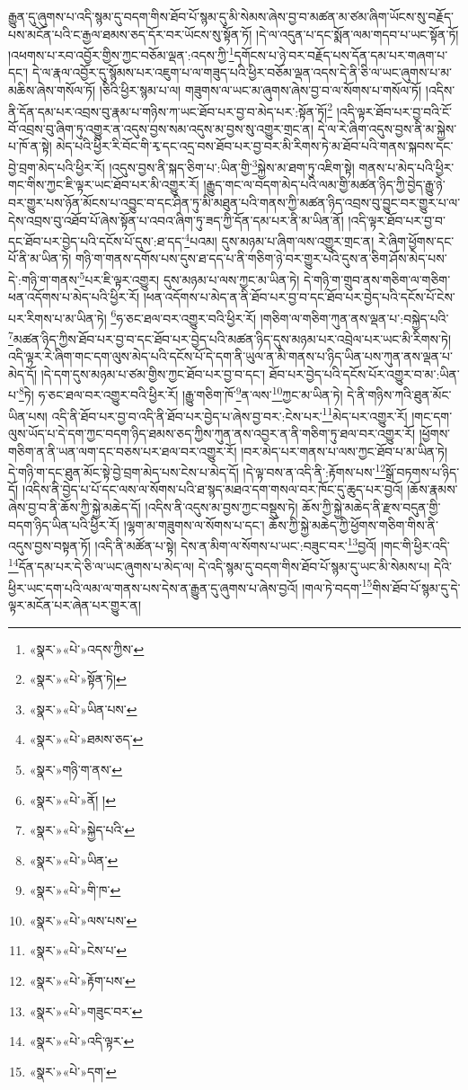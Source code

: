 རྒྱུན་དུ་ཞུགས་པ་འདི་སྙམ་དུ་བདག་གིས་ཐོབ་པོ་སྙམ་དུ་མི་སེམས་ཞེས་བྱ་བ་མཚན་མ་ཙམ་ཞིག་ཡོངས་སུ་བརྗོད་པས་མངོན་པའི་ང་རྒྱལ་ཐམས་ཅད་དོར་བར་ཡོངས་སུ་སྟོན་ཏོ། །དེ་ལ་འདུན་པ་དང་སྨོན་ལམ་གདབ་པ་ཡང་སྟོན་ཏོ། །འཕགས་པ་རབ་འབྱོར་གྱིས་ཀྱང་བཅོམ་ལྡན་:འདས་ཀྱི་\footnote{«སྣར་»«པེ་»འདས་ཀྱིས་}དགོངས་པ་ཉེ་བར་བརྗོད་པས་དོན་དམ་པར་གཞག་པ་དང་། དེ་ལ་རྣལ་འབྱོར་དུ་སྙོམས་པར་འཇུག་པ་ལ་གཟུད་པའི་ཕྱིར་བཅོམ་ལྡན་འདས་དེ་ནི་ཅི་ལ་ཡང་ཞུགས་པ་མ་མཆིས་ཞེས་གསོལ་ཏོ། །ཅིའི་ཕྱིར་སྙམ་པ་ལ། གཟུགས་ལ་ཡང་མ་ཞུགས་ཞེས་བྱ་བ་ལ་སོགས་པ་གསོལ་ཏོ། །འདིས་ནི་དོན་དམ་པར་འབྲས་བུ་རྣམ་པ་གཉིས་ཀ་ཡང་ཐོབ་པར་བྱ་བ་མེད་པར་:སྟོན་ཏོ།\footnote{«སྣར་»«པེ་»སྟོན་ཏེ།} །འདི་ལྟར་ཐོབ་པར་བྱ་བའི་ངོ་བོ་འབྲས་བུ་ཞིག་ཏུ་འགྱུར་ན་འདུས་བྱས་སམ་འདུས་མ་བྱས་སུ་འགྱུར་གྲང་ན། དེ་ལ་རེ་ཞིག་འདུས་བྱས་ནི་མ་སྐྱེས་པ་ཁོ་ན་སྟེ། མེད་པའི་ཕྱིར་རི་བོང་གི་རྭ་དང་འདྲ་བས་ཐོབ་པར་བྱ་བར་མི་རིགས་ཏེ་མ་ཐོབ་པའི་གནས་སྐབས་དང་བྱེ་བྲག་མེད་པའི་ཕྱིར་རོ། །འདུས་བྱས་ནི་སྐད་ཅིག་པ་:ཡིན་གྱི་\footnote{«སྣར་»«པེ་»ཡིན་པས་}སྐྱེས་མ་ཐག་ཏུ་འཇིག་སྟེ། གནས་པ་མེད་པའི་ཕྱིར་གང་གིས་ཀྱང་ཇི་ལྟར་ཡང་ཐོབ་པར་མི་འགྱུར་རོ། །རྒྱུད་གང་ལ་བདག་མེད་པའི་ལམ་གྱི་མཚན་ཉིད་ཀྱི་བྱེད་རྒྱུ་ཉེ་བར་གྱུར་པས་ཉོན་མོངས་པ་འབྱུང་བ་དང་ཤིན་ཏུ་མི་མཐུན་པའི་གནས་ཀྱི་མཚན་ཉིད་འབྲས་བུ་བྱུང་བར་གྱུར་པ་ལ་དེས་འབྲས་བུ་འཐོབ་པོ་ཞེས་སྟོན་པ་འབའ་ཞིག་ཏུ་ཟད་ཀྱི་དོན་དམ་པར་ནི་མ་ཡིན་ནོ། །འདི་ལྟར་ཐོབ་པར་བྱ་བ་དང་ཐོབ་པར་བྱེད་པའི་དངོས་པོ་དུས་:ཐ་དད་\footnote{«སྣར་»«པེ་»ཐམས་ཅད་}པའམ། དུས་མཉམ་པ་ཞིག་ལས་འགྱུར་གྲང་ན། རེ་ཞིག་ཕྱོགས་དང་པོ་ནི་མ་ཡིན་ཏེ། གཉི་ག་གནས་དགོས་པས་དུས་ཐ་དད་པ་ནི་གཅིག་ཉེ་བར་གྱུར་པའི་དུས་ན་ཅིག་ཤོས་མེད་པས་དེ་:གཉི་ག་གནས་\footnote{«སྣར་»གཉི་ག་ནས་}པར་ཇི་ལྟར་འགྱུར། དུས་མཉམ་པ་ལས་ཀྱང་མ་ཡིན་ཏེ། དེ་གཉི་ག་གྲུབ་ནས་གཅིག་ལ་གཅིག་ཕན་འདོགས་པ་མེད་པའི་ཕྱིར་རོ། །ཕན་འདོགས་པ་མེད་ན་ནི་ཐོབ་པར་བྱ་བ་དང་ཐོབ་པར་བྱེད་པའི་དངོས་པོ་ངེས་པར་རིགས་པ་མ་ཡིན་ཏེ། \footnote{«སྣར་»«པེ་»ནོ། ། }ཧ་ཅང་ཐལ་བར་འགྱུར་བའི་ཕྱིར་རོ། །གཅིག་ལ་གཅིག་ཀུན་ནས་ལྡན་པ་:བསྐྱེད་པའི་\footnote{«སྣར་»«པེ་»སྐྱེད་པའི་}མཚན་ཉིད་ཀྱིས་ཐོབ་པར་བྱ་བ་དང་ཐོབ་པར་བྱེད་པའི་མཚན་ཉིད་དུས་མཉམ་པར་འབྲེལ་པར་ཡང་མི་རིགས་ཏེ། འདི་ལྟར་རེ་ཞིག་གང་དག་ལུས་མེད་པའི་དངོས་པོ་དེ་དག་ནི་ཡུལ་ན་མི་གནས་པ་ཉིད་ཡིན་པས་ཀུན་ནས་ལྡན་པ་མེད་དོ། །དེ་དག་དུས་མཉམ་པ་ཙམ་གྱིས་ཀྱང་ཐོབ་པར་བྱ་བ་དང་། ཐོབ་པར་བྱེད་པའི་དངོས་པོར་འགྱུར་བ་མ་:ཡིན་པ་\footnote{«སྣར་»«པེ་»ཡིན་}ཏེ། ཧ་ཅང་ཐལ་བར་འགྱུར་བའི་ཕྱིར་རོ། །རྒྱུ་གཅིག་ཁོ་\footnote{«སྣར་»«པེ་»གི་ཁ་}ན་ལས་\footnote{«སྣར་»«པེ་»ལས་པས་}ཀྱང་མ་ཡིན་ཏེ། དེ་ནི་གཉིས་ཀའི་ཐུན་མོང་ཡིན་པས། འདི་ནི་ཐོབ་པར་བྱ་བ་འདི་ནི་ཐོབ་པར་བྱེད་པ་ཞེས་བྱ་བར་:ངེས་པར་\footnote{«སྣར་»«པེ་»ངེས་པ་}མེད་པར་འགྱུར་རོ། །གང་དག་ལུས་ཡོད་པ་དེ་དག་ཀྱང་བདག་ཉིད་ཐམས་ཅད་ཀྱིས་ཀུན་ནས་འབྱར་ན་ནི་གཅིག་ཏུ་ཐལ་བར་འགྱུར་རོ། །ཕྱོགས་གཅིག་ན་ནི་ཡན་ལག་དང་བཅས་པར་ཐལ་བར་འགྱུར་རོ། །བར་མེད་པར་གནས་པ་ལས་ཀྱང་ཐོབ་པ་མ་ཡིན་ཏེ། དེ་གཉི་ག་དང་ཐུན་མོང་སྟེ་བྱེ་བྲག་མེད་པས་ངེས་པ་མེད་དོ། །དེ་ལྟ་བས་ན་འདི་ནི་:རྟོགས་པས་\footnote{«སྣར་»«པེ་»རྟོག་པས་}སྒྲོ་བཏགས་པ་ཉིད་དོ། །འདིས་ནི་བྱེད་པ་པོ་དང་ལས་ལ་སོགས་པའི་ཐ་སྙད་མཐའ་དག་གསལ་བར་ཁོང་དུ་ཆུད་པར་བྱའོ། །ཆོས་རྣམས་ཞེས་བྱ་བ་ནི་ཆོས་ཀྱི་སྐྱེ་མཆེད་དོ། །འདིས་ནི་འདུས་མ་བྱས་ཀྱང་བསྡུས་ཏེ། ཆོས་ཀྱི་སྐྱེ་མཆེད་ནི་རྫས་བདུན་གྱི་བདག་ཉིད་ཡིན་པའི་ཕྱིར་རོ། །ལྷག་མ་གཟུགས་ལ་སོགས་པ་དང་། ཆོས་ཀྱི་སྐྱེ་མཆེད་ཀྱི་ཕྱོགས་གཅིག་གིས་ནི་འདུས་བྱས་བསྟན་ཏོ། །འདི་ནི་མཚོན་པ་སྟེ། དེས་ན་མིག་ལ་སོགས་པ་ཡང་:བཟུང་བར་\footnote{«སྣར་»«པེ་»གཟུང་བར་}བྱའོ། །གང་གི་ཕྱིར་འདི་\footnote{«སྣར་»«པེ་»འདི་ལྟར་}དོན་དམ་པར་དེ་ཅི་ལ་ཡང་ཞུགས་པ་མེད་ལ། དེ་འདི་སྙམ་དུ་བདག་གིས་ཐོབ་པོ་སྙམ་དུ་ཡང་མི་སེམས་པ། དེའི་ཕྱིར་ཡང་དག་པའི་ལམ་ལ་གནས་པས་དེས་ན་རྒྱུན་དུ་ཞུགས་པ་ཞེས་བྱའོ། །གལ་ཏེ་བདག་\footnote{«སྣར་»«པེ་»དག་}གིས་ཐོབ་པོ་སྙམ་དུ་དེ་ལྟར་མངོན་པར་ཞེན་པར་གྱུར་ན། 